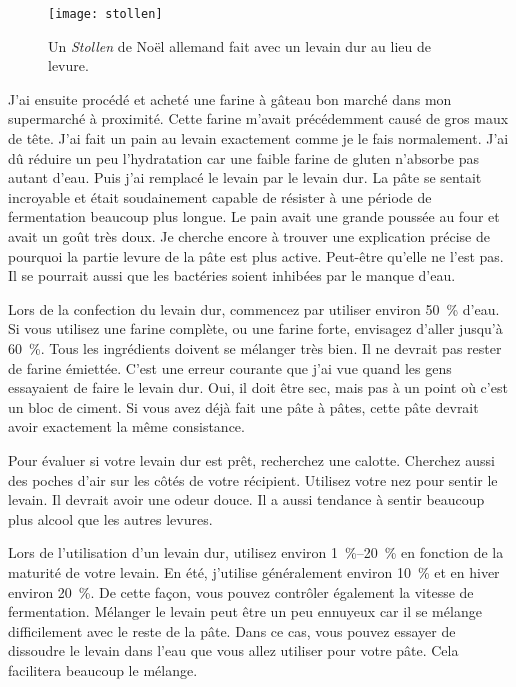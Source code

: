 \begin{figure}[!htb]
  \texttt{[image: stollen]}
  \caption[\emph{Stollen} de Noël]{Un \emph{Stollen} de Noël allemand fait
      avec un levain dur au lieu de levure.}%
  \label{fig:stollen}
\end{figure}J'ai ensuite procédé et acheté une farine à gâteau bon marché dans mon supermarché à proximité.
Cette farine m'avait précédemment causé de gros maux de tête. J'ai fait un pain au levain
exactement comme je le fais normalement. J'ai dû réduire un peu l'hydratation car une faible
farine de gluten n'absorbe pas autant d'eau. Puis j'ai remplacé le levain par
le levain dur. La pâte se sentait incroyable et était soudainement capable de résister à
une période de fermentation beaucoup plus longue. Le pain avait une grande poussée au four et avait un goût
très doux. Je cherche encore à trouver une explication précise de pourquoi la partie levure de
la pâte est plus active. Peut-être qu'elle ne l'est pas. Il se pourrait aussi que les bactéries
soient inhibées par le manque d'eau.

Lors de la confection du levain dur, commencez par utiliser environ \qty{50}{\percent}
d'eau. Si vous utilisez une farine complète, ou une farine forte, envisagez d'aller
jusqu'à \qty{60}{\percent}. Tous les ingrédients doivent se mélanger très bien. Il
ne devrait pas rester de farine émiettée. C'est une erreur courante que j'ai vue quand
les gens essayaient de faire le levain dur. Oui, il doit être sec, mais pas à un
point où c'est un bloc de ciment. Si vous avez déjà fait une pâte à pâtes, cette
pâte devrait avoir exactement la même consistance.

Pour évaluer si votre levain dur est prêt, recherchez une calotte. Cherchez aussi
des poches d'air sur les côtés de votre récipient. Utilisez votre nez pour sentir le
levain. Il devrait avoir une odeur douce. Il a aussi tendance à sentir beaucoup plus
alcool que les autres levures.

Lors de l'utilisation d'un levain dur, utilisez environ \qtyrange{1}{20}{\percent} en fonction de
la maturité de votre levain. En été, j'utilise généralement environ
\qty{10}{\percent} et en hiver environ \qty{20}{\percent}. De cette façon, vous pouvez
contrôler également la vitesse de fermentation.
Mélanger le levain peut être un peu ennuyeux car il se mélange difficilement avec
le reste de la pâte. Dans ce cas, vous pouvez essayer de dissoudre le levain dans l'eau
que vous allez utiliser pour votre pâte. Cela facilitera beaucoup le mélange.


